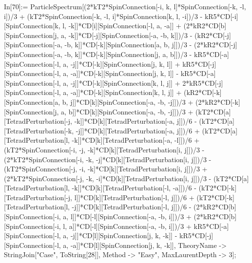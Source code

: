 In[70]:= ParticleSpectrum[(2*kT2*SpinConnection[-i, k, l]*SpinConnection[-k, -l, i])/3 + (kT2*SpinConnection[-k, -l, i]*SpinConnection[k, l, -i])/3 - kR5*CD[-i][SpinConnection[k, l, -k]]*CD[i][SpinConnection[-l, a, -a]] + (2*kR2*CD[b][SpinConnection[j, a, -k]]*CD[-j][SpinConnection[-a, -b, k]])/3 - (kR2*CD[-j][SpinConnection[-a, -b, k]]*CD[-k][SpinConnection[a, b, j]])/3 - (2*kR2*CD[-j][SpinConnection[-a, -b, k]]*CD[-k][SpinConnection[j, a, b]])/3 - kR5*CD[-a][SpinConnection[-l, a, -j]]*CD[-k][SpinConnection[j, k, l]] + kR5*CD[-j][SpinConnection[-l, a, -a]]*CD[-k][SpinConnection[j, k, l]] - kR5*CD[-a][SpinConnection[-l, a, -j]]*CD[-k][SpinConnection[k, l, j]] + 2*kR5*CD[-j][SpinConnection[-l, a, -a]]*CD[-k][SpinConnection[k, l, j]] + (kR2*CD[-k][SpinConnection[a, b, j]]*CD[k][SpinConnection[-a, -b, -j]])/3 + (2*kR2*CD[-k][SpinConnection[j, a, b]]*CD[k][SpinConnection[-a, -b, -j]])/3 + (kT2*CD[a][TetradPerturbation[-j, -k]]*CD[k][TetradPerturbation[-a, j]])/6 - (kT2*CD[a][TetradPerturbation[-k, -j]]*CD[k][TetradPerturbation[-a, j]])/6 + (kT2*CD[a][TetradPerturbation[l, -k]]*CD[k][TetradPerturbation[-a, -l]])/6 + (kT2*SpinConnection[-i, -j, -k]*CD[k][TetradPerturbation[i, j]])/3 - (2*kT2*SpinConnection[-i, -k, -j]*CD[k][TetradPerturbation[i, j]])/3 - (kT2*SpinConnection[-j, -i, -k]*CD[k][TetradPerturbation[i, j]])/3 + (2*kT2*SpinConnection[-j, -k, -i]*CD[k][TetradPerturbation[i, j]])/3 - (kT2*CD[a][TetradPerturbation[l, -k]]*CD[k][TetradPerturbation[-l, -a]])/6 - (kT2*CD[-k][TetradPerturbation[-j, l]]*CD[k][TetradPerturbation[-l, j]])/6 + (kT2*CD[-k][TetradPerturbation[l, -j]]*CD[k][TetradPerturbation[-l, j]])/6 - (2*kR2*CD[b][SpinConnection[-i, a, l]]*CD[-l][SpinConnection[-a, -b, i]])/3 + (2*kR2*CD[b][SpinConnection[-i, l, a]]*CD[-l][SpinConnection[-a, -b, i]])/3 + kR5*CD[-a][SpinConnection[-l, a, -j]]*CD[l][SpinConnection[j, k, -k]] - kR5*CD[-j][SpinConnection[-l, a, -a]]*CD[l][SpinConnection[j, k, -k]], TheoryName -> StringJoin["Case", ToString[28]], Method -> "Easy", MaxLaurentDepth -> 3]; 